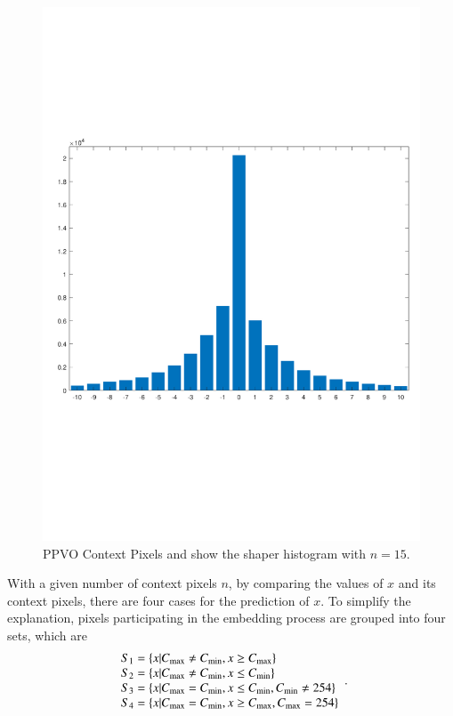 \documentclass[review,3p,10pt,sort&compress]{elsarticle}
\begin{document}
\begin{figure}
{\begin{minipage}[t]{0.42\linewidth}
    \includegraphics[width=1\textwidth]{figures/PPVO_Lena_CN15_hist_PN.pdf}
    \end{minipage}
}		
\centering
\caption{PPVO Context Pixels and show the shaper histogram with $n = 15$.}
\label{Fig.PPVOCNandHist}
\end{figure}
With a given number of context pixels $n$, by comparing the values of $x$ and its context pixels, there are four cases for the prediction of $x$. To simplify the explanation, pixels participating in the embedding process are grouped into four sets, which are
\begin{equation*}\label{eq:S}
\begin{array}{ll}
    S_1 = \{ x | C_{\rm max} \neq C_{\rm min}, x \geq C_{\rm max} \} \\
    S_2 = \{ x | C_{\rm max} \neq C_{\rm min}, x \leq C_{\rm min} \} \\
    S_3 = \{ x | C_{\rm max}   =  C_{\rm min}, x \leq C_{\rm min}, C_{\rm min} \neq 254 \} \\
    S_4 = \{ x | C_{\rm max}   =  C_{\rm min}, x \geq C_{\rm max}, C_{\rm max} =  254 \} \\
\end{array}.
\end{equation*}
\end{document}
